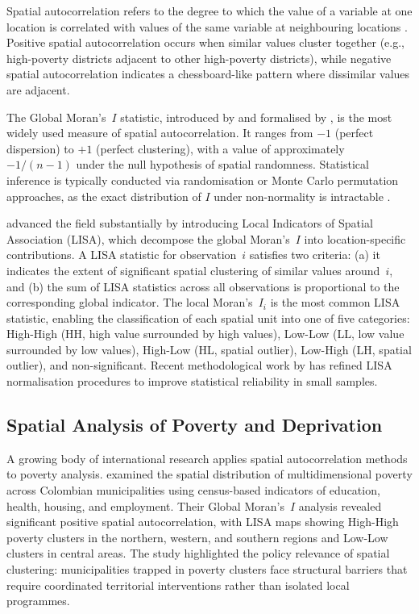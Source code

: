 \documentclass[12pt,a4paper,twoside]{article}
\begin{document}
Spatial autocorrelation refers to the degree to which the value of a variable at
one location is correlated with values of the same variable at neighbouring
locations \citep{moran1950}. Positive spatial autocorrelation occurs when similar
values cluster together (e.g., high-poverty districts adjacent to other high-poverty
districts), while negative spatial autocorrelation indicates a chessboard-like
pattern where dissimilar values are adjacent.

The Global Moran's~$I$ statistic, introduced by \citet{moran1950} and formalised
by \citet{cliff1973}, is the most widely used measure of spatial autocorrelation.
It ranges from $-1$ (perfect dispersion) to $+1$ (perfect clustering), with a value
of approximately $-1/(n-1)$ under the null hypothesis of spatial randomness.
Statistical inference is typically conducted via randomisation or Monte Carlo
permutation approaches, as the exact distribution of $I$ under non-normality is
intractable \citep{anselin1995lisa}.

\citet{anselin1995lisa} advanced the field substantially by introducing Local
Indicators of Spatial Association (LISA), which decompose the global Moran's~$I$
into location-specific contributions. A LISA statistic for observation~$i$ satisfies
two criteria: (a) it indicates the extent of significant spatial clustering of
similar values around~$i$, and (b) the sum of LISA statistics across all
observations is proportional to the corresponding global indicator. The local
Moran's~$I_i$ is the most common LISA statistic, enabling the classification of
each spatial unit into one of five categories: High-High (HH, high value surrounded
by high values), Low-Low (LL, low value surrounded by low values), High-Low (HL,
spatial outlier), Low-High (LH, spatial outlier), and non-significant. Recent
methodological work by \citet{chen2022reconstruction} has refined LISA
normalisation procedures to improve statistical reliability in small samples.

\subsection{Spatial Analysis of Poverty and Deprivation}

A growing body of international research applies spatial autocorrelation methods to
poverty analysis. \citet{gonzalez2025pobreza} examined the spatial distribution of
multidimensional poverty across Colombian municipalities using census-based
indicators of education, health, housing, and employment. Their Global Moran's~$I$
analysis revealed significant positive spatial autocorrelation, with LISA maps
showing High-High poverty clusters in the northern, western, and southern regions
and Low-Low clusters in central areas. The study highlighted the policy relevance
of spatial clustering: municipalities trapped in poverty clusters face structural
barriers that require coordinated territorial interventions rather than isolated
local programmes.
\end{document}
